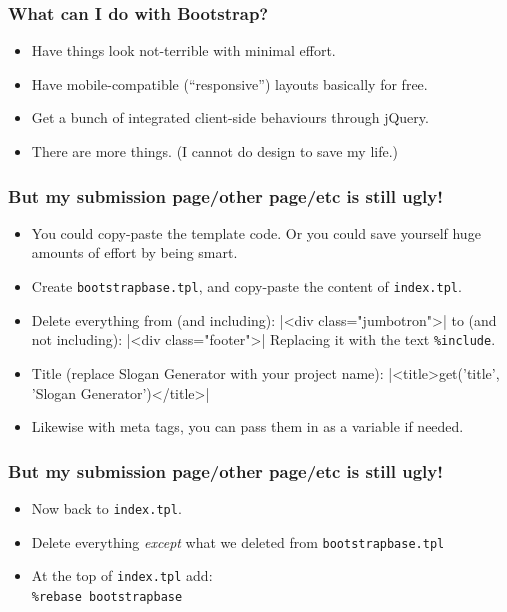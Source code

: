 \documentclass{beamer}
\begin{document}
\begin{frame}
  \frametitle{What can I do with Bootstrap?}
  \begin{itemize}
  \item Have things look not-terrible with minimal effort.
  \item Have mobile-compatible (``responsive'') layouts basically for
    free.
  \item Get a bunch of integrated client-side behaviours through
    jQuery.
  \item There are more things. (I cannot do design to save my life.)
  \end{itemize}
\end{frame}

\begin{frame}[fragile]
  \frametitle{But my submission page/other page/etc is still ugly!}
  \begin{itemize}
  \item You could copy-paste the template code. Or you could save
    yourself huge amounts of effort by being smart.
  \item Create \texttt{bootstrapbase.tpl}, and copy-paste the content
    of \texttt{index.tpl}.
  \item Delete everything from (and including):
|<div class="jumbotron">|
to (and not including):
|<div class="footer">|
Replacing it with the text \texttt{\%include}.
\item Title (replace Slogan Generator with your project name):
|<title>{{get('title', 'Slogan Generator')}}</title>|
\item Likewise with meta tags, you can pass them in as a variable if
  needed.
  \end{itemize}
\end{frame}

\begin{frame}
  \frametitle{But my submission page/other page/etc is still ugly!}
  \begin{itemize}
  \item Now back to \texttt{index.tpl}.
  \item Delete everything \emph{except} what we deleted from
    \texttt{bootstrapbase.tpl}
  \item At the top of \texttt{index.tpl} add:\\
    \texttt{\%rebase bootstrapbase}
  \end{itemize}
\end{frame} 
\end{document}
